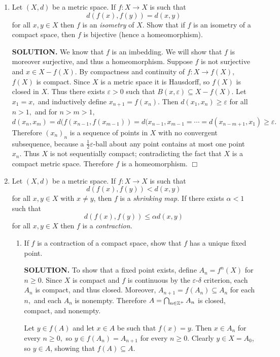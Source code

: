 \documentclass{article}
\begin{document}
\begin{enumerate}
    \item Let $(X, d)$ be a metric space. If $f: X \rightarrow X$ is such that
    $$d(f(x), f(y)) = d(x, y)$$
    for all $x, y \in X$ then $f$ is an {\it isometry} of $X.$ Show that if $f$ is an isometry of a compact space, then $f$ is bijective (hence a homeomorphism).

    {\bf SOLUTION.} We know that $f$ is an imbedding. We will show that $f$ is moreover surjective, and thus a homeomorphism. Suppose $f$ is not surjective and $x \in X- f(X).$ By compactness and continuity of $f: X \rightarrow f(X),$ $f(X)$ is compact. Since $X$ is a metric space it is Hausdorff, so $f(X)$ is closed in $X.$ Thus there exists $\varepsilon > 0$ such that $B(x, \varepsilon) \subseteq X-f(X).$ Let $x_1 = x,$ and inductively define $x_{n+1} = f(x_n).$ Then $d(x_1, x_n) \geq \varepsilon$ for all $n > 1,$ and for $n > m > 1,$
    $$d(x_n, x_m) = d(f(x_{n-1}, f(x_{m-1})) = d(x_{n-1}, x_{m-1} = \cdots = d(x_{n-m+1}, x_1) \geq \varepsilon.$$
    Therefore $(x_n)_n$ is a sequence of points in $X$ with no convergent subsequence, because a $\frac12 \varepsilon$-ball about any point contains at most one point $x_n.$ Thus $X$ is not sequentially compact; contradicting the fact that $X$ is a compact metric space. Therefore $f$ is a homeomorphism. $\Box$

    \item Let $(X, d)$ be a metric space. If $f: X \rightarrow X$ is such that
    $$d(f(x), f(y)) < d(x, y)$$
    for all $x, y \in X$ with $x \neq y$, then $f$ is a {\it shrinking map.} If there exists $\alpha < 1$ such that 
    $$d(f(x), f(y)) \leq \alpha d(x, y)$$
    for all $x, y \in X$ then $f$ is a {\it contraction.}
    \begin{enumerate}
        \item If $f$ is a contraction of a compact space, show that $f$ has a unique fixed point.

        {\bf SOLUTION.} To show that a fixed point exists, define $A_n = f^n(X)$ for $n \geq 0$. Since $X$ is compact and $f$ is continuous by the $\varepsilon$-$\delta$ criterion, each $A_n$ is compact, and thus closed. Moreover, $A_{n+1} = f(A_n) \subseteq A_n$ for each $n,$ and each $A_n$ is nonempty. Therefore $A = \bigcap_{n \in \mathbb{Z}^+} A_n$ is closed, compact, and nonempty.
        
        Let $y \in f(A)$ and let $x \in A$ be such that $f(x) = y.$ Then $x \in A_n$ for every $n \geq 0,$ so $y \in f(A_n) = A_{n+1}$ for every $n \geq 0.$ Clearly $y \in X = A_0$, so $y \in A$, showing that $f(A) \subseteq A.$
        

\end{enumerate}
\end{enumerate}
\end{document}
